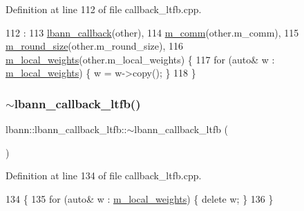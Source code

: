 Definition at line 112 of file callback\+\_\+ltfb.\+cpp.


\begin{DoxyCode}
112                                                                          :
113   \hyperlink{classlbann_1_1lbann__callback_a679057298a41ddd47f08c157f756c584}{lbann\_callback}(other),
114   \hyperlink{classlbann_1_1lbann__callback__ltfb_a7536bb519c8a89b518a3196f953ac048}{m\_comm}(other.m\_comm),
115   \hyperlink{classlbann_1_1lbann__callback__ltfb_a78434b8e8b1dfa43a68a9707473cf789}{m\_round\_size}(other.m\_round\_size),
116   \hyperlink{classlbann_1_1lbann__callback__ltfb_a5e5b9917b9eee67b8e14c6e8f95a85a3}{m\_local\_weights}(other.m\_local\_weights) \{
117   \textcolor{keywordflow}{for} (\textcolor{keyword}{auto}& w : \hyperlink{classlbann_1_1lbann__callback__ltfb_a5e5b9917b9eee67b8e14c6e8f95a85a3}{m\_local\_weights}) \{ w = w->copy(); \}
118 \}
\end{DoxyCode}
\mbox{\label{classlbann_1_1lbann__callback__ltfb_abfb61fe2c92147dff98f861adb2d5c74}} 
\subsubsection{\texorpdfstring{$\sim$lbann\+\_\+callback\+\_\+ltfb()}{~lbann\_callback\_ltfb()}}
{\footnotesize\ttfamily lbann\+::lbann\+\_\+callback\+\_\+ltfb\+::$\sim$lbann\+\_\+callback\+\_\+ltfb (\begin{DoxyParamCaption}{ }\end{DoxyParamCaption})\hspace{0.3cm}{\ttfamily [override]}}



Definition at line 134 of file callback\+\_\+ltfb.\+cpp.


\begin{DoxyCode}
134                                           \{
135   \textcolor{keywordflow}{for} (\textcolor{keyword}{auto}& w : \hyperlink{classlbann_1_1lbann__callback__ltfb_a5e5b9917b9eee67b8e14c6e8f95a85a3}{m\_local\_weights}) \{ \textcolor{keyword}{delete} w; \}
136 \}
\end{DoxyCode}


